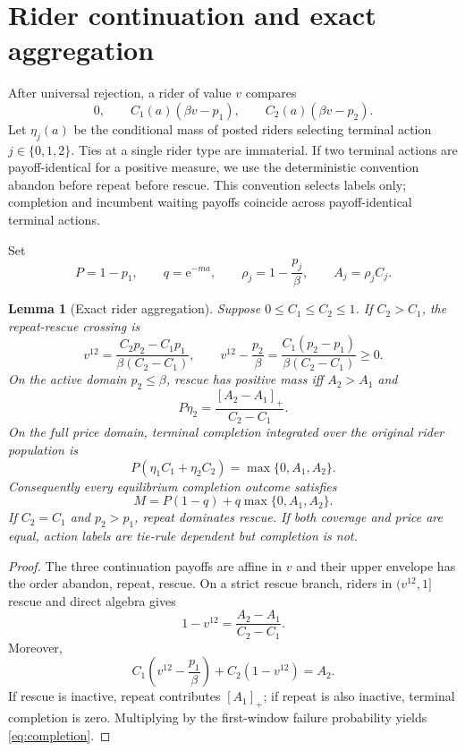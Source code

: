 \documentclass[11pt]{article}
\newtheorem{lemma}[theorem]{Lemma}
\theoremstyle{definition}
\theoremstyle{remark}
\newcommand{\e}{\mathrm e}
\begin{document}
\section{Rider continuation and exact aggregation}

After universal rejection, a rider of value $v$ compares
\[
0,\qquad C_1(a)(\beta v-p_1),\qquad
C_2(a)(\beta v-p_2).
\]
Let $\eta_j(a)$ be the conditional mass of posted riders selecting terminal
action $j\in\{0,1,2\}$.  Ties at a single rider type are immaterial.  If two
terminal actions are payoff-identical for a positive measure, we use the
deterministic convention abandon before repeat before rescue.  This convention
selects labels only; completion and incumbent waiting payoffs coincide across
payoff-identical terminal actions.

Set
\[
P=1-p_1,\qquad q=\e^{-ma},\qquad
\rho_j=1-\frac{p_j}{\beta},\qquad A_j=\rho_j C_j.
\]

\begin{lemma}[Exact rider aggregation]
\label{lem:rider}
Suppose $0\le C_1\le C_2\le1$.  If $C_2>C_1$, the repeat-rescue crossing is
\[
v^{12}=\frac{C_2p_2-C_1p_1}{\beta(C_2-C_1)},
\qquad
v^{12}-\frac{p_2}{\beta}
=\frac{C_1(p_2-p_1)}{\beta(C_2-C_1)}\ge0.
\]
On the active domain $p_2\le\beta$, rescue has positive mass iff $A_2>A_1$
and
\[
P\eta_2=\frac{[A_2-A_1]_+}{C_2-C_1}.
\]
On the full price domain, terminal completion integrated over the original
rider population is
\[
P(\eta_1C_1+\eta_2C_2)=\max\{0,A_1,A_2\}.
\]
Consequently every equilibrium completion outcome satisfies
\begin{equation}
M=P(1-q)+q\max\{0,A_1,A_2\}.
\label{eq:completion}
\end{equation}
If $C_2=C_1$ and $p_2>p_1$, repeat dominates rescue.  If both coverage and
price are equal, action labels are tie-rule dependent but completion is not.
\end{lemma}

\begin{proof}
The three continuation payoffs are affine in $v$ and their upper envelope has
the order abandon, repeat, rescue.  On a strict rescue branch, riders in
$(v^{12},1]$ rescue and direct algebra gives
\[
1-v^{12}=\frac{A_2-A_1}{C_2-C_1}.
\]
Moreover,
\[
C_1\left(v^{12}-\frac{p_1}{\beta}\right)
+C_2(1-v^{12})=A_2.
\]
If rescue is inactive, repeat contributes $[A_1]_+$; if repeat is also
inactive, terminal completion is zero.  Multiplying by the first-window
failure probability yields \eqref{eq:completion}.
\end{proof}
\end{document}

